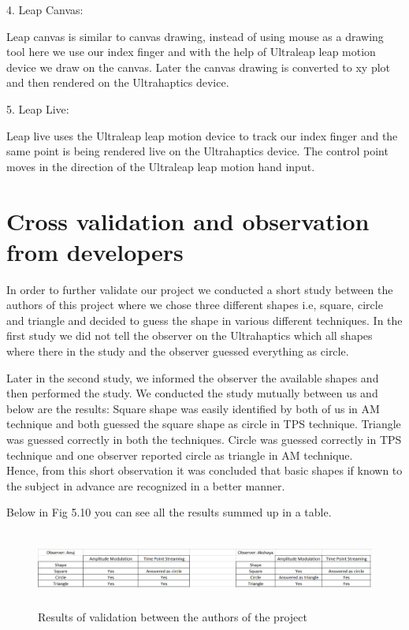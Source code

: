 4. Leap Canvas:

Leap canvas is similar to canvas drawing, instead of using mouse as a drawing tool here we use our index finger and with the help of Ultraleap leap motion device we draw on the canvas. Later the canvas drawing is converted to xy plot and then rendered on the Ultrahaptics device.

5. Leap Live:

Leap live uses the Ultraleap leap motion device to track our index finger and the same point is being rendered live on the Ultrahaptics device. The control point moves in the direction of the Ultraleap leap motion hand input.

\section{Cross validation and observation from developers}
\label{sec:validation:cross validation and observation from developers}

In order to further validate our project we conducted a short study between the authors of this project where we chose three different shapes i.e, square, circle and triangle and decided to guess the shape in various different techniques. In the first study we did not tell the observer on the Ultrahaptics which all shapes where there in the study and the observer guessed everything as circle. 

Later in the second study, we informed the observer the available shapes and then performed the study. We conducted the study mutually between us and below are the results:
Square shape was easily identified by both of us in AM technique and both guessed the square shape as circle in TPS technique. Triangle was guessed correctly in both the techniques. Circle was guessed correctly in TPS technique and one observer reported circle as triangle in AM technique. \\
Hence, from this short observation it was concluded that basic shapes if known to the subject in advance are recognized in a better manner.

Below in Fig 5.10 you can see all the results summed up in a table. 

\begin{figure}[H]
	\includegraphics[width=150mm, height=25mm]{gfx/user_study_result.png}
	\caption{Results of validation between the authors of the project}
	\label{fig:validation:svg_sq_tps}
\end{figure}


